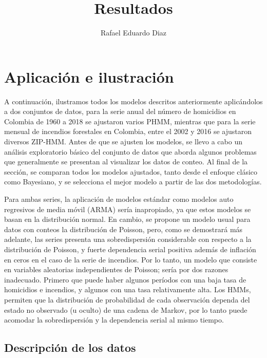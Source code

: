\documentclass[a4paper]{article}\usepackage[]{graphicx}\usepackage[]{color}
\title{Resultados} %
\author{Rafael Eduardo Diaz} %
\begin{document}
\maketitle
\section{Aplicación e ilustración}

A continuación, ilustramos todos los modelos descritos anteriormente aplicándolos a dos conjuntos de datos, para la serie anual del número de homicidios en Colombia de 1960 a 2018 se ajustaron varios PHMM, mientras que para la serie mensual de incendios forestales en Colombia, entre el 2002 y 2016 se ajustaron diversos ZIP-HMM. Antes de que se ajusten los modelos, se llevo a cabo un análisis exploratorio básico del conjunto de datos que aborda algunos problemas que generalmente se presentan al visualizar los datos de conteo. Al final de la sección, se comparan todos los modelos ajustados, tanto desde el enfoque clásico como Bayesiano, y se selecciona el mejor modelo a partir de las dos metodologías. 

\vspace{5mm} %

Para ambas series, la aplicación de modelos estándar como modelos auto regresivos de media móvil (ARMA) sería inapropiado, ya que estos modelos se basan en la distribución normal. En cambio, se propone un modelo usual para datos con conteos la distribución de Poisson, pero, como se demostrará más adelante, las series presenta una sobredispersión considerable con respecto a la distribución de Poisson, y fuerte dependencia serial positiva además de inflación en ceros en el caso de la serie de incendios. Por lo tanto, un modelo que consiste en variables aleatorias independientes de Poisson; sería por dos razones inadecuado. Primero que puede haber algunos períodos con una baja tasa de homicidios e incendios, y algunos con una tasa relativamente alta. Los HMMs, permiten que la distribución de probabilidad de cada observación dependa del estado no observado (u oculto) de una cadena de Markov, por lo tanto puede acomodar la sobredispersión y la dependencia serial al mismo tiempo.



\subsection{Descripción de los datos}
\end{document}
